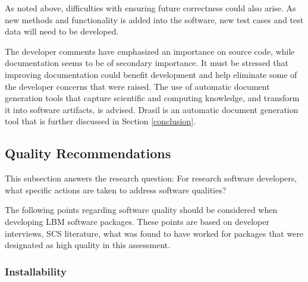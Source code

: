 \documentclass[12pt, notitlepage]{article}
\begin{document}
As noted above, difficulties with ensuring future correctness could also arise. As new methods and functionality is added into the software, new test cases and test data will need to be developed.

The developer comments have emphasized an importance on source code, while documentation seems to be of secondary importance. It must be stressed that improving documentation could benefit development and help eliminate some of the developer concerns that were raised. The use of automatic document generation tools that capture scientific and computing knowledge, and transform it into software artifacts, is advised. Drasil is an automatic document generation tool that is further discussed in Section \ref{conclusion}.

\subsection{Quality Recommendations}\label{qualityrecommentations}

This subsection answers the research question: For research software developers, what specific actions are taken to address software qualities?

The following points regarding software quality should be considered when developing LBM software packages. These points are based on developer interviews, SCS literature, what was found to have worked for packages that were designated as high quality in this assessment.

\subsubsection{Installability}
\end{document}
